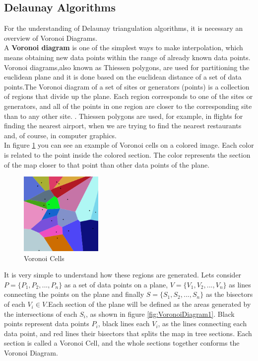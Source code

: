\documentclass[conference]{IEEEtran}
\begin{document}
\subsection{Delaunay Algorithms}
For the understanding of Delaunay  triangulation  algorithms,  it is necessary an overview of Voronoi Diagrams.\\
A \textbf{ Voronoi diagram} is  one  of  the  simplest  ways  to  make interpolation,  which  means  obtaining  new  data  points  within the  range  of  already  known  data  points.  Voronoi  diagrams,also known as Thiessen polygons, are used for partitioning the euclidean plane and it is done based on the euclidean distance of a set of data points.The Voronoi diagram of a set of sites or generators (points) is a  collection  of  regions  that  divide  up  the  plane.  Each  region corresponds  to  one  of  the  sites  or  generators,  and  all  of  the points in one region are closer to the corresponding site than to any other site. \cite{VoronoiD}. Thiessen polygons are used, for example, in  flights  for  finding  the  nearest  airport,  when  we  are  trying to  find  the  nearest  restaurants  and,  of  course,  in  computer graphics.\\In  figure  \ref{fig:VoronoiColored} you  can  see  an  example  of  Voronoi  cells  on  a colored  image.  Each  color  is  related  to  the  point  inside  the colored  section.  The  color  represents  the  section  of  the  map closer to that point than other data points of the plane.

\begin{figure}[H]
    \centering
    \includegraphics[width=150,height=150,keepaspectratio]{VoronoiColors.png}
    \caption{Voronoi Cells}
    \label{fig:VoronoiColored}
\end{figure}
    
It is very simple to understand how these regions are generated. Lets consider $P=\{P_1,P_2,...,P_n\}$ as a set of data points on a plane, $V={\{V_1,V_2,...,V_n\}}$ as lines connecting the points on the plane and finally $S={\{S_1,S_2,...,S_n\}}$ as the bisectors of each $V_i \in V$.Each section of the plane will be defined as the areas generated by the intersections of each $S_i$, as shown in figure \ref{fig:VoronoiDiagram1}. Black points represent data points $P_i$, black lines each $V_i$, as the lines connecting each data point, and red lines their bisectors that splits the map in tree sections. Each section is called a Voronoi Cell, and the whole sections together conforms the Voronoi Diagram.
\end{document}
